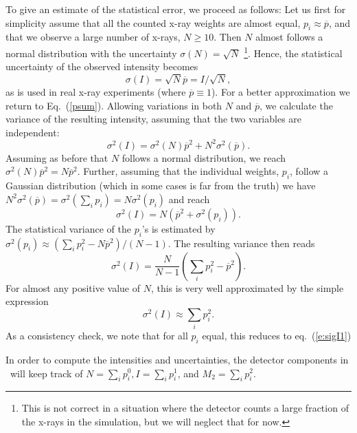 To give an estimate of the statistical error, we proceed as follows:
Let us first for simplicity assume that all the counted x-ray weights are
almost equal, $p_i \approx \overline{p}$,
and that we observe a large number of x-rays, $N \geq 10$.
Then $N$ almost follows a normal distribution
with the uncertainty $\sigma(N) = \sqrt{N}$
\footnote{This is not correct in a
situation where the detector counts a large fraction of the
x-rays in the simulation, but we will neglect that for now.}.
Hence, the statistical uncertainty of the observed intensity becomes
\begin{equation} \label{e:sigI1}
 \sigma(I) = \sqrt{N} \overline{p} = I / \sqrt{N} ,
\end{equation}
as is used in real x-ray experiments (where $\overline{p} \equiv 1$).
For a better approximation we return to Eq.~(\ref{psum}).
Allowing variations in both $N$ and $\overline{p}$,
we calculate the variance of the resulting intensity,
assuming that the two variables are independent:
\begin{equation}
\sigma^2(I) = \sigma^2(N) \overline{p}^2 + N^2 \sigma^2(\overline{p}) .
\end{equation}
Assuming as before that $N$ follows a normal distribution, we reach
$\sigma^2(N) \overline{p}^2 = N \overline{p}^2$.
Further, assuming that the individual weights, $p_i$,
follow a Gaussian distribution (which in some cases is far from the truth)
we have
$N^2 \sigma^2(\overline{p}) = \sigma^2(\sum_i p_i) = N \sigma^2(p_i)$
and reach
\begin{equation}
\sigma^2(I) = N \left( \overline{p}^2 + \sigma^2(p_i) \right).
\end{equation}
The statistical variance of the $p_i$'s is estimated by
$\sigma^2(p_i) \approx  (\sum_i p_i^2 - N \overline{p}^2) / (N-1)$.
The resulting variance then reads
\begin{equation}
\sigma^2(I) = \frac{N}{N-1} \left( \sum_i p_i^2 - \overline{p}^2  \right) .
\end{equation}
For almost any positive value of $N$, this is very well approximated
by the simple expression
\begin{equation}
\sigma^2(I) \approx \sum_i p_i^2 .
\end{equation}
As a consistency check, we note that for all $p_i$ equal, this reduces to
eq.~(\ref{e:sigI1})

In order to compute the intensities and uncertainties, the detector components
in \MCX\ will keep track of
$N=\sum_i p_i^0, I=\sum_i p_i^1$, and $M_2 = \sum_i p_i^2$.

